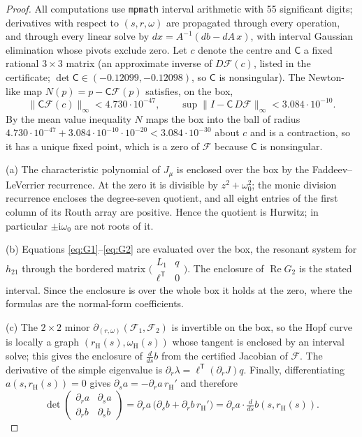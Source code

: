 \documentclass[11pt,a4paper]{article}
\theoremstyle{plain}
\theoremstyle{definition}
\theoremstyle{remark}
\newcommand{\ii}{\mathrm i}
\newcommand{\T}{\mathsf T}
\newcommand{\norm}[1]{\lVert#1\rVert}
\DeclareMathOperator{\Ree}{Re}
\begin{document}
\begin{proof}
All computations use \texttt{mpmath} interval arithmetic with 55 significant digits; derivatives with respect to $(s,r,\omega)$ are propagated through every operation, and through every linear solve by $dx=A^{-1}(db-dA\,x)$, with interval Gaussian elimination whose pivots exclude zero. Let $c$ denote the centre and $\mathsf C$ a fixed rational $3\times3$ matrix (an approximate inverse of $D\mathcal F(c)$, listed in the certificate; $\det\mathsf C\in(-0.12099,-0.12098)$, so $\mathsf C$ is nonsingular). The Newton-like map $N(p)=p-\mathsf C\mathcal F(p)$ satisfies, on the box,
\[
\norm{\mathsf C\mathcal F(c)}_\infty<4.730\cdot10^{-47},\qquad
\sup\norm{I-\mathsf C\,D\mathcal F}_\infty<3.084\cdot10^{-10}.
\]
By the mean value inequality $N$ maps the box into the ball of radius $4.730\cdot10^{-47}+3.084\cdot10^{-10}\cdot10^{-20}<3.084\cdot10^{-30}$ about $c$ and is a contraction, so it has a unique fixed point, which is a zero of $\mathcal F$ because $\mathsf C$ is nonsingular.

(a) The characteristic polynomial of $J_\mu$ is enclosed over the box by the Faddeev--LeVerrier recurrence. At the zero it is divisible by $z^2+\omega_0^2$; the monic division recurrence encloses the degree-seven quotient, and all eight entries of the first column of its Routh array are positive. Hence the quotient is Hurwitz; in particular $\pm\ii\omega_0$ are not roots of it.

(b) Equations \eqref{eq:G1}--\eqref{eq:G2} are evaluated over the box, the resonant system for $h_{21}$ through the bordered matrix $\bigl(\begin{smallmatrix}L_1&q\\ \ell^\T&0\end{smallmatrix}\bigr)$. The enclosure of $\Ree G_2$ is the stated interval. Since the enclosure is over the whole box it holds at the zero, where the formulas are the normal-form coefficients.

(c) The $2\times2$ minor $\partial_{(r,\omega)}(\mathcal F_1,\mathcal F_2)$ is invertible on the box, so the Hopf curve is locally a graph $(r_{\mathrm H}(s),\omega_{\mathrm H}(s))$ whose tangent is enclosed by an interval solve; this gives the enclosure of $\frac d{ds}b$ from the certified Jacobian of $\mathcal F$. The derivative of the simple eigenvalue is $\partial_r\lambda=\ell^\T(\partial_rJ)q$. Finally, differentiating $a(s,r_{\mathrm H}(s))=0$ gives $\partial_sa=-\partial_ra\,r_{\mathrm H}'$ and therefore
\begin{equation}\label{eq:detid}
\det\begin{pmatrix}\partial_ra&\partial_sa\\ \partial_rb&\partial_sb\end{pmatrix}
=\partial_ra\,\bigl(\partial_sb+\partial_rb\,r_{\mathrm H}'\bigr)=\partial_ra\cdot\tfrac d{ds}b(s,r_{\mathrm H}(s)).
\end{equation}
\end{proof}
\end{document}
